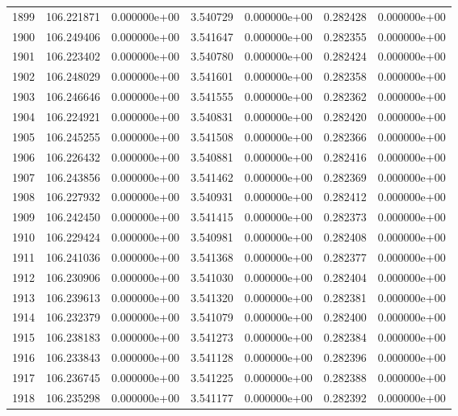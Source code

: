 \begin{tabular}{rrrrrrr}
1899 & 106.221871 &  0.000000e+00 &  3.540729 &  0.000000e+00 &    0.282428 &  0.000000e+00 \\
1900 & 106.249406 &  0.000000e+00 &  3.541647 &  0.000000e+00 &    0.282355 &  0.000000e+00 \\
1901 & 106.223402 &  0.000000e+00 &  3.540780 &  0.000000e+00 &    0.282424 &  0.000000e+00 \\
1902 & 106.248029 &  0.000000e+00 &  3.541601 &  0.000000e+00 &    0.282358 &  0.000000e+00 \\
1903 & 106.246646 &  0.000000e+00 &  3.541555 &  0.000000e+00 &    0.282362 &  0.000000e+00 \\
1904 & 106.224921 &  0.000000e+00 &  3.540831 &  0.000000e+00 &    0.282420 &  0.000000e+00 \\
1905 & 106.245255 &  0.000000e+00 &  3.541508 &  0.000000e+00 &    0.282366 &  0.000000e+00 \\
1906 & 106.226432 &  0.000000e+00 &  3.540881 &  0.000000e+00 &    0.282416 &  0.000000e+00 \\
1907 & 106.243856 &  0.000000e+00 &  3.541462 &  0.000000e+00 &    0.282369 &  0.000000e+00 \\
1908 & 106.227932 &  0.000000e+00 &  3.540931 &  0.000000e+00 &    0.282412 &  0.000000e+00 \\
1909 & 106.242450 &  0.000000e+00 &  3.541415 &  0.000000e+00 &    0.282373 &  0.000000e+00 \\
1910 & 106.229424 &  0.000000e+00 &  3.540981 &  0.000000e+00 &    0.282408 &  0.000000e+00 \\
1911 & 106.241036 &  0.000000e+00 &  3.541368 &  0.000000e+00 &    0.282377 &  0.000000e+00 \\
1912 & 106.230906 &  0.000000e+00 &  3.541030 &  0.000000e+00 &    0.282404 &  0.000000e+00 \\
1913 & 106.239613 &  0.000000e+00 &  3.541320 &  0.000000e+00 &    0.282381 &  0.000000e+00 \\
1914 & 106.232379 &  0.000000e+00 &  3.541079 &  0.000000e+00 &    0.282400 &  0.000000e+00 \\
1915 & 106.238183 &  0.000000e+00 &  3.541273 &  0.000000e+00 &    0.282384 &  0.000000e+00 \\
1916 & 106.233843 &  0.000000e+00 &  3.541128 &  0.000000e+00 &    0.282396 &  0.000000e+00 \\
1917 & 106.236745 &  0.000000e+00 &  3.541225 &  0.000000e+00 &    0.282388 &  0.000000e+00 \\
1918 & 106.235298 &  0.000000e+00 &  3.541177 &  0.000000e+00 &    0.282392 &  0.000000e+00 \\

\end{tabular}
